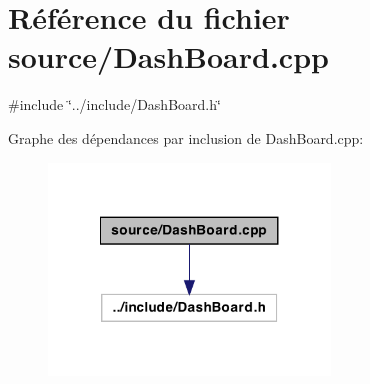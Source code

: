 \hypertarget{a00002}{
\section{Référence du fichier source/DashBoard.cpp}
\label{a00002}
}
{\ttfamily \#include \char`\"{}../include/DashBoard.h\char`\"{}}\par
Graphe des dépendances par inclusion de DashBoard.cpp:
\nopagebreak
\begin{figure}[H]
\begin{center}
\leavevmode
\includegraphics[width=212pt]{a00009}
\end{center}
\end{figure}
